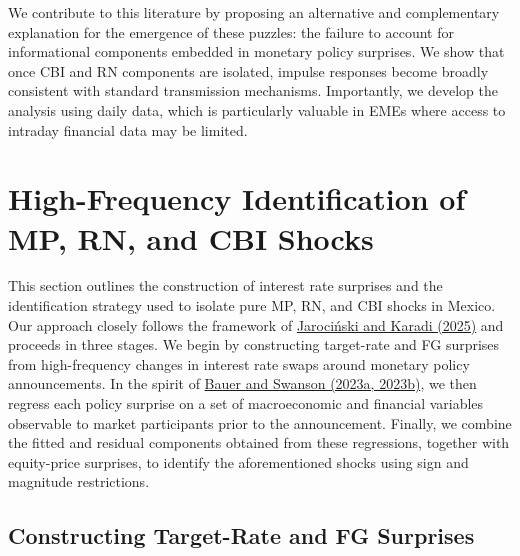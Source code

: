 \documentclass[12pt, reqno]{article}
\begin{document}
We contribute to this literature by proposing an alternative and complementary explanation for the emergence of these puzzles: the failure to account for informational components embedded in monetary policy surprises. We show that once CBI and RN components are isolated, impulse responses become broadly consistent with standard transmission mechanisms. Importantly, we develop the analysis using daily data, which is particularly valuable in EMEs where access to intraday financial data may be limited.


\section{High-Frequency Identification of MP, RN, and CBI Shocks}
\label{sec:identification}

This section outlines the construction of interest rate surprises and the identification strategy used to isolate pure MP, RN, and CBI shocks in Mexico. Our approach closely follows the framework of \hyperlink{Jarociński and Karadi (2025)}{Jarociński and Karadi (2025)} and proceeds in three stages. We begin by constructing target-rate and FG surprises from high-frequency changes in interest rate swaps around monetary policy announcements. In the spirit of \hyperlink{Bauer and Swanson (2023a, 2023b)}{Bauer and Swanson (2023a, 2023b)}, we then regress each policy surprise on a set of macroeconomic and financial variables observable to market participants prior to the announcement. Finally, we combine the fitted and residual components obtained from these regressions, together with equity-price surprises, to identify the aforementioned shocks using sign and magnitude restrictions.


\subsection{Constructing Target-Rate and FG Surprises}
\end{document}
